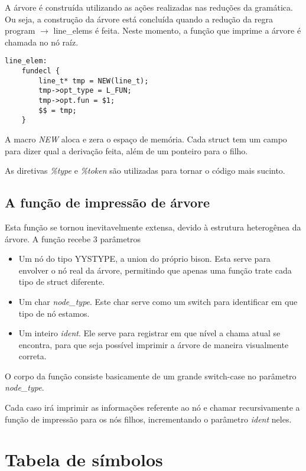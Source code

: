 \documentclass[11pt]{article}
\begin{document}
A árvore é construída utilizando as ações realizadas nas reduções da gramática. 
Ou seja, a construção da árvore está concluída quando a redução da regra program $\rightarrow$ line\_elems é feita.
Neste momento, a função que imprime a árvore é chamada no nó raíz. 

\begin{lstlisting}[basicstyle=\small] 
line_elem:
    fundecl {
        line_t* tmp = NEW(line_t);
        tmp->opt_type = L_FUN;
        tmp->opt.fun = $1;
        $$ = tmp; 
    }
\end{lstlisting}

A macro \emph{NEW} aloca e zera o espaço de memória. Cada struct tem um campo para dizer qual a derivação feita,
além de um ponteiro para o filho.

As diretivas \emph{\%type} e \emph{\%token} são utilizadas para tornar o código mais sucinto.

\subsection{A função de impressão de árvore}

Esta função se tornou inevitavelmente extensa, devido à estrutura heterogênea da árvore.
A função recebe 3 parâmetros 
\begin{itemize}
    \item Um nó do tipo YYSTYPE, a union do próprio bison. Esta serve para envolver o nó real da árvore,
        permitindo que apenas uma função trate cada tipo de struct diferente.
    \item Um char \emph{node\_type}. Este char serve como um switch para identificar em que tipo de nó estamos.
    \item Um inteiro \emph{ident}. Ele serve para registrar em que nível a chama atual se encontra, para que
        seja possível imprimir a árvore de maneira visualmente correta.
\end{itemize}

O corpo da função consiste basicamente de um grande switch-case no parâmetro \emph{node\_type}.

Cada caso irá imprimir as informações referente ao nó e chamar recursivamente a função de impressão
para os nós filhos, incrementando o parâmetro \emph{ident} neles.

\section{Tabela de símbolos}
\end{document}
